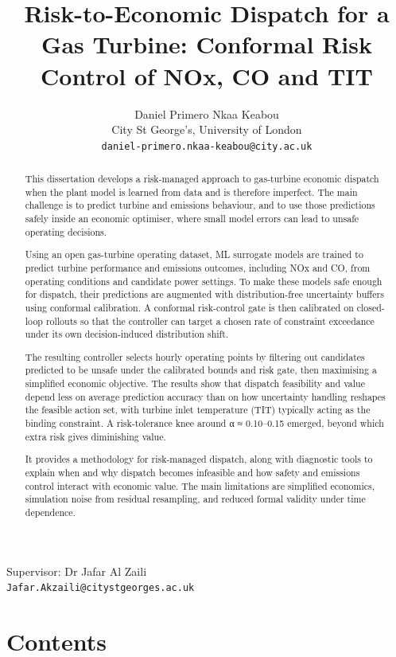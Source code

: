 \documentclass[11pt]{article}
\title{
  \textbf{Risk-to-Economic Dispatch for a Gas Turbine: Conformal Risk Control of NOx, CO and TIT}
}
\author{
  Daniel Primero Nkaa Keabou\\
  City St George's, University of London\\
  \texttt{daniel-primero.nkaa-keabou@city.ac.uk}
}
\date{}
\begin{document}
\maketitle

\begin{center}
Supervisor: Dr Jafar Al Zaili\\
\texttt{Jafar.Akzaili@citystgeorges.ac.uk}
\end{center}

\begin{abstract}
This dissertation develops a risk-managed approach to gas-turbine economic dispatch when the plant model is learned from data and is therefore imperfect. The main challenge is to predict turbine and emissions behaviour, and to use those predictions safely inside an economic optimiser, where small model errors can lead to unsafe operating decisions.

Using an open gas-turbine operating dataset, ML surrogate models are trained to predict turbine performance and emissions outcomes, including NOx and CO, from operating conditions and candidate power settings. To make these models safe enough for dispatch, their predictions are augmented with distribution-free uncertainty buffers using conformal calibration. A conformal risk-control gate is then calibrated on closed-loop rollouts so that the controller can target a chosen rate of constraint exceedance under its own decision-induced distribution shift.

The resulting controller selects hourly operating points by filtering out candidates predicted to be unsafe under the calibrated bounds and risk gate, then maximising a simplified economic objective. The results show that dispatch feasibility and value depend less on average prediction accuracy than on how uncertainty handling reshapes the feasible action set, with turbine inlet temperature (TIT) typically acting as the binding constraint. A risk-tolerance knee around α ≈ 0.10--0.15 emerged, beyond which extra risk gives diminishing value.

It provides a methodology for risk-managed dispatch, along with diagnostic tools to explain when and why dispatch becomes infeasible and how safety and emissions control interact with economic value. The main limitations are simplified economics, simulation noise from residual resampling, and reduced formal validity under time dependence.
\end{abstract}

\section{Contents}\label{contents}
\end{document}
